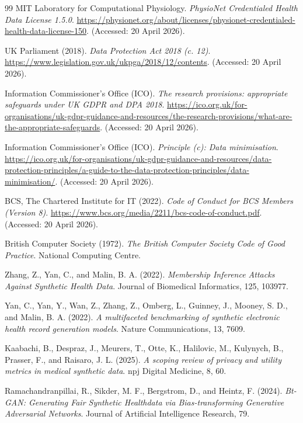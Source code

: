 \documentclass[11pt]{informatics-report}
\begin{document}
\begin{thebibliography}{99}
MIT Laboratory for Computational Physiology.
\textit{PhysioNet Credentialed Health Data License 1.5.0}.
\url{https://physionet.org/about/licenses/physionet-credentialed-health-data-license-150}.
(Accessed: 20 April 2026).

UK Parliament (2018).
\textit{Data Protection Act 2018 (c. 12)}.
\url{https://www.legislation.gov.uk/ukpga/2018/12/contents}.
(Accessed: 20 April 2026).

Information Commissioner's Office (ICO).
\textit{The research provisions: appropriate safeguards under UK GDPR and DPA 2018}.
\url{https://ico.org.uk/for-organisations/uk-gdpr-guidance-and-resources/the-research-provisions/what-are-the-appropriate-safeguards}.
(Accessed: 20 April 2026).

Information Commissioner's Office (ICO).
\textit{Principle (c): Data minimisation}.
\url{https://ico.org.uk/for-organisations/uk-gdpr-guidance-and-resources/data-protection-principles/a-guide-to-the-data-protection-principles/data-minimisation/}.
(Accessed: 20 April 2026).

BCS, The Chartered Institute for IT (2022).
\textit{Code of Conduct for BCS Members (Version 8)}.
\url{https://www.bcs.org/media/2211/bcs-code-of-conduct.pdf}.
(Accessed: 20 April 2026).

British Computer Society (1972).
\textit{The British Computer Society Code of Good Practice}.
National Computing Centre.

Zhang, Z., Yan, C., and Malin, B. A. (2022).
\textit{Membership Inference Attacks Against Synthetic Health Data}.
Journal of Biomedical Informatics, 125, 103977.

Yan, C., Yan, Y., Wan, Z., Zhang, Z., Omberg, L., Guinney, J., Mooney, S. D., and Malin, B. A. (2022).
\textit{A multifaceted benchmarking of synthetic electronic health record generation models}.
Nature Communications, 13, 7609.

Kaabachi, B., Despraz, J., Meurers, T., Otte, K., Halilovic, M., Kulynych, B., Prasser, F., and Raisaro, J. L. (2025).
\textit{A scoping review of privacy and utility metrics in medical synthetic data}.
npj Digital Medicine, 8, 60.

Ramachandranpillai, R., Sikder, M. F., Bergstrom, D., and Heintz, F. (2024).
\textit{Bt-GAN: Generating Fair Synthetic Healthdata via Bias-transforming Generative Adversarial Networks}.
Journal of Artificial Intelligence Research, 79.


\end{thebibliography}
\end{document}
